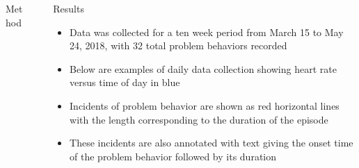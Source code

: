\documentclass[final]{beamer}
\newlength{\sepwid}
\newlength{\onecolwid}
\newlength{\twocolwid}
\begin{document}
\begin{frame}[t]
\begin{columns}[t]
\begin{column}{\onecolwid}
\begin{alertblock}{Method}
\end{alertblock}


\end{column} %

\begin{column}{\sepwid}\end{column} %

\begin{column}{\twocolwid} %
	

\begin{alertblock}{Results}
	
	\begin{itemize}
		\item Data was collected for a ten week period from March 15 to May 24, 2018, with 32 total problem behaviors recorded
		\item Below are examples of daily data collection showing heart rate versus time of day in blue
		\item Incidents of problem behavior are shown as red horizontal lines with the length corresponding to the duration of the episode
		\item These incidents are also annotated with text giving the onset time of the problem behavior followed by its duration
	\end{itemize}
	
\end{alertblock}


\begin{columns}[t,totalwidth=\twocolwid] %

\begin{column}{\onecolwid}\vspace{-.6in} %



\end{column}
\end{columns}
\end{column}
\end{columns}
\end{frame}
\end{document}
